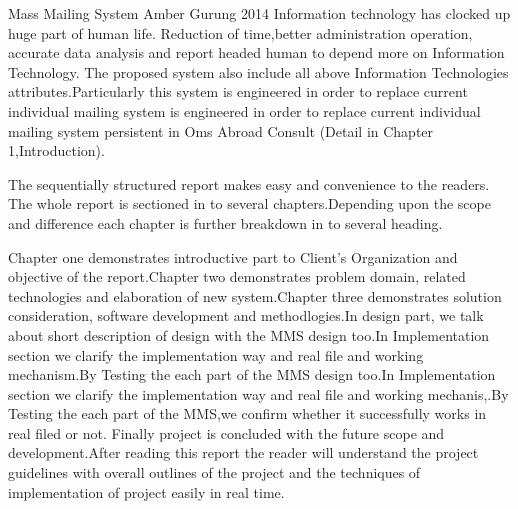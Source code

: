  \begin{conf-abstract}[]
{Mass Mailing System}
{
Amber Gurung
}
{2014}
Information technology has clocked up huge part of human life.
Reduction of time,better administration operation, accurate data analysis
and report headed human to depend more on Information Technology.
The proposed system also include all above Information Technologies
attributes.Particularly this system is engineered in order to replace
current individual mailing system is engineered in order to replace
current individual mailing system persistent in Oms Abroad Consult
(Detail in Chapter 1,Introduction).

The sequentially structured report makes easy and convenience to the
readers. The whole report is sectioned in to several chapters.Depending
upon the scope and difference each chapter is further breakdown in to 
several heading.

Chapter one demonstrates introductive part to Client's Organization and
objective of the report.Chapter two demonstrates problem domain,
related technologies and elaboration of new system.Chapter three
demonstrates solution consideration, software development and
methodlogies.In design part, we talk about short description of design
with the MMS design too.In Implementation section we clarify the
implementation way and real file and working mechanism.By Testing
the each part of the MMS design too.In Implementation section we clarify the
implementation way and real file and working mechanis,.By Testing
the each part of the MMS,we confirm whether it successfully works in
real filed or not. Finally project is concluded with the future scope and 
development.After reading this report the reader will understand the
project guidelines with overall outlines of the project and the techniques
of implementation of project easily in real time.
  \end{conf-abstract}